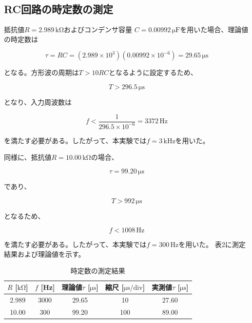 \documentclass[11pt,a4paper]{jsarticle}
\begin{document}
\subsection{RC回路の時定数の測定}

抵抗値$R=2.989\,\mathrm{k\Omega}$およびコンデンサ容量
$C=0.00992\,\mathrm{\mu F}$を用いた場合、理論値の時定数は

\begin{equation}
\tau=RC
=(2.989\times10^3)(0.00992\times10^{-6})
=29.65\,\mathrm{\mu s}
\end{equation}

となる。方形波の周期は$T>10RC$となるように設定するため、

\begin{equation}
T>296.5\,\mathrm{\mu s}
\end{equation}

となり、入力周波数は

\begin{equation}
f<\frac{1}{296.5\times10^{-6}}
=3372\,\mathrm{Hz}
\end{equation}

を満たす必要がある。したがって、本実験では$f=3\,\mathrm{kHz}$を用いた。

同様に、抵抗値$R=10.00\,\mathrm{k\Omega}$の場合、

\begin{equation}
\tau=99.20\,\mathrm{\mu s}
\end{equation}

であり、

\begin{equation}
T>992\,\mathrm{\mu s}
\end{equation}

となるため、

\begin{equation}
f<1008\,\mathrm{Hz}
\end{equation}

を満たす必要がある。したがって、本実験では$f=300\,\mathrm{Hz}$を用いた。
表2に測定結果および理論値を示す。
\begin{table}[H]
\centering
\caption{時定数の測定結果}
\label{tab:tau}
\begin{tabular}{ccccc}
\toprule
$R$ [$\mathrm{k\Omega}$] &
$f$ [Hz] &
理論値$\tau$ [$\mathrm{\mu s}$] &
縮尺 [$\mathrm{\mu s/div}$] &
実測値$\tau$ [$\mathrm{\mu s}$] \\
\midrule
2.989 & 3000 & 29.65 & 10 & 27.60\\
10.00 & 300  & 99.20 & 100 & 89.00\\
\bottomrule
\end{tabular}
\end{table}
\end{document}

